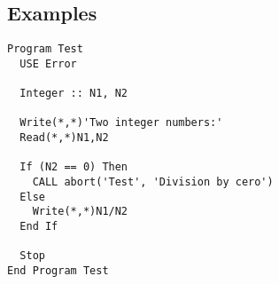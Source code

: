 \subsection{Examples}

\begin{lstlisting}[emph=abort,
                   emphstyle=\color{blue},
                   frame=trBL,
                   caption=Print error message and stop a program.,
                   label=abort]
Program Test
  USE Error

  Integer :: N1, N2

  Write(*,*)'Two integer numbers:'
  Read(*,*)N1,N2

  If (N2 == 0) Then
    CALL abort('Test', 'Division by cero')
  Else 
    Write(*,*)N1/N2
  End If

  Stop
End Program Test
\end{lstlisting}


